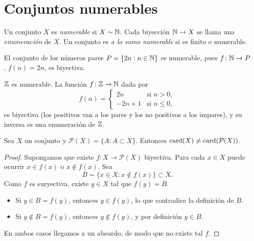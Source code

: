\section{Conjuntos numerables}

\begin{definition}
  Un conjunto \(X\) es \emph{numerable} si \(X \sim \mathbb{N}\). Cada biyección \(\mathbb{N} \to X\) se llama una \emph{enumeración} de \(X\). Un conjunto es \emph{a lo sumo numerable} si es finito o numerable.
\end{definition}

\begin{eg}
  El conjunto de los números pares \(P = \{ 2n : n \in \mathbb{N} \}\) es numerable, pues \(f\colon \mathbb{N} \to P\), \(f(n) = 2n\), es biyectiva.
\end{eg}

\begin{eg}
  \(\mathbb{Z}\) es numerable. La función \(f\colon \mathbb{Z} \to \mathbb{N}\) dada por
  \[
    f(n) =
    \begin{cases}
      2n      & \text{si } n > 0,    \\
      -2n + 1 & \text{si } n \leq 0,
    \end{cases}
  \]
  es biyectiva (los positivos van a los pares y los no positivos a los impares), y su inversa es una enumeración de \(\mathbb{Z}\).
\end{eg}

\begin{theorem}[Cantor]
  Sea \(X\) un conjunto y \(\mathcal{P}(X) = \{ A : A \subset X \}\). Entonces \(\operatorname{card}(X) \neq \operatorname{card}(\mathcal{P}(X))\).
\end{theorem}

\begin{proof}
  Supongamos que existe \(f\colon X \to \mathcal{P}(X)\) biyectiva. Para cada \(x \in X\) puede ocurrir \(x \in f(x)\) o \(x \notin f(x)\). Sea
  \[
    B = \{ x \in X : x \notin f(x) \} \subset X.
  \]
  Como \(f\) es suryectiva, existe \(y \in X\) tal que \(f(y) = B\).
  \begin{itemize}
    \item Si \(y \in B = f(y)\), entonces \(y \in f(y)\), lo que contradice la definición de \(B\).
    \item Si \(y \notin B = f(y)\), entonces \(y \notin f(y)\), y por definición \(y \in B\).
  \end{itemize}
  En ambos casos llegamos a un absurdo, de modo que no existe tal \(f\).
\end{proof}

